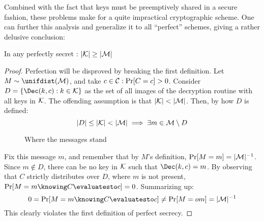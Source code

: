 
Combined with the fact that keys must be preemptively shared in a secure fashion, these problems make for a quite impractical cryptographic scheme. One can further this analysis and generalize it to all ``perfect'' schemes, giving a rather delusive conclusion:

\begin{theorem}
    In any perfectly secret \ske{}: $|\mathcal{K}| \geq |\mathcal{M}|$
\end{theorem}
\begin{proof}
    Perfection will be disproved by breaking the first definition. Let $M \sim \unifdist(\M)$, and take $c \in \mathcal{C} : \Pr[C = c] > 0$. Consider $D = \{\Dec(k, c) : k \in \K\}$ as the set of all images of the decryption routine with all keys in $\mathcal{K}$. The offending assumption is that $|\mathcal{K}| < |\mathcal{M}|$. Then, by how $D$ is defined:
    \[
        |D| \leq |\mathcal{K}| < |\mathcal{M}| \implies \exists m \in \mathcal{M} \setminus D
    \]

    \begin{figure}[h]
        \centering
        \def\firstcircle{(0,0) circle (1.5cm)}
        \def\secondcircle{(60:0) circle (0.9cm)}
        \caption{Where the messages stand}
    \end{figure}

    Fix this message $m$, and remember that by $M$'s definition, $\Pr[M = m] = |\mathcal{M}|^{-1}$. Since $m \notin D$, there can be no key in $\mathcal{K}$ such that $\Dec(k, c) = m$. By observing that $C$ strictly distributes over $D$, where $m$ is not present, $\Pr[M = m \knowing C \evaluatesto c] = 0$. Summarizing up:
    \[
        0 = \Pr[M = m \knowing C \evaluatesto c] \neq \Pr[M =o m] = |\M|^{-1}
    \]
    This clearly violates the first definition of perfect secrecy.
\end{proof}
